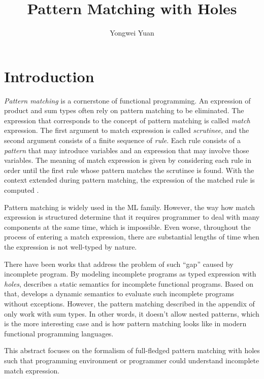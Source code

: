 \documentclass[acmsmall,screen,review,nonacm]{acmart}
\theoremstyle{slplain}
\numberwithin{thm}{section}
\begin{document}
  
\title{Pattern Matching with Holes}

\author{Yongwei Yuan}

\maketitle

\section{Introduction}
\emph{Pattern matching} is a cornerstone of functional programming. An expression of product and sum types often rely on pattern matching to be eliminated.
The expression that corresponds to the concept of pattern matching is called \emph{match} expression. The first argument to match expression is called \emph{scrutinee}, and the second argument consists of a finite sequence of \emph{rule}. Each rule consists of a \emph{pattern} that may introduce variables and an expression that may involve those variables. The meaning of match expression is given by considering each rule in order until the first rule whose pattern matches the scrutinee is found. With the context extended during pattern matching, the expression of the matched rule is computed \cite{Harper2012}.

Pattern matching is widely used in the ML family. However, the way how match expression is structured determine that it requires programmer to deal with many components at the same time, which is impossible. Even worse, throughout the process of entering a match expression, there are substantial lengths of time when the expression is not well-typed by nature.

There have been works that address the problem of such ``gap'' caused by incomplete program. By modeling incomplete programs as typed expression with \emph{holes}, \citet{DBLP:conf/popl/OmarVHAH17} describes a static semantics for incomplete functional programs. Based on that, \citet{DBLP:journals/pacmpl/OmarVCH19} develops a dynamic semantics to evaluate such incomplete programs without exceptions. However, the pattern matching described in the appendix of \citet{DBLP:journals/pacmpl/OmarVCH19} only work with sum types. In other words, it doesn't allow nested patterns, which is the more interesting case and is how pattern matching looks like in modern functional programming languages.

This abstract focuses on the formalism of full-fledged pattern matching with holes such that programming environment or programmer could understand incomplete match expression.
\end{document}
